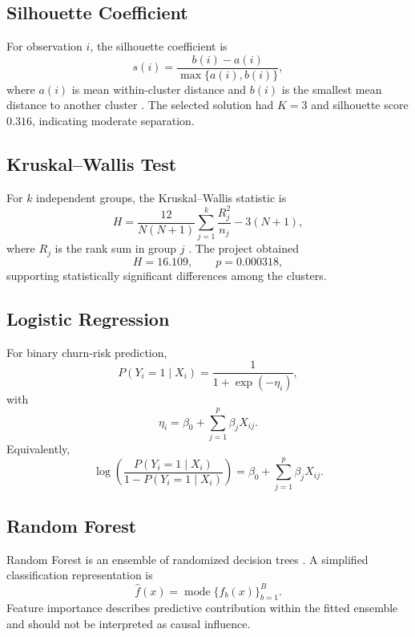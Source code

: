 \documentclass[11pt,a4paper]{article}
\begin{document}
\subsection{Silhouette Coefficient}

For observation $i$, the silhouette coefficient is
\begin{equation}
s(i)=
\frac{b(i)-a(i)}
{\max\{a(i),b(i)\}},
\end{equation}
where $a(i)$ is mean within-cluster distance and $b(i)$ is the smallest
mean distance to another cluster \cite{silhouette}. The selected
solution had $K=3$ and silhouette score $0.316$, indicating moderate
separation.

\subsection{Kruskal--Wallis Test}

For $k$ independent groups, the Kruskal--Wallis statistic is
\begin{equation}
H=
\frac{12}{N(N+1)}
\sum_{j=1}^{k}\frac{R_j^2}{n_j}
-3(N+1),
\end{equation}
where $R_j$ is the rank sum in group $j$ \cite{kruskal}. The project
obtained
\begin{equation}
H=16.109,\qquad p=0.000318,
\end{equation}
supporting statistically significant differences among the clusters.

\subsection{Logistic Regression}

For binary churn-risk prediction,
\begin{equation}
P(Y_i=1\mid X_i)=
\frac{1}{1+\exp(-\eta_i)},
\end{equation}
with
\begin{equation}
\eta_i=\beta_0+\sum_{j=1}^{p}\beta_jX_{ij}.
\end{equation}
Equivalently,
\begin{equation}
\log\left(\frac{P(Y_i=1\mid X_i)}
{1-P(Y_i=1\mid X_i)}\right)
=\beta_0+\sum_{j=1}^{p}\beta_jX_{ij}.
\end{equation}

\subsection{Random Forest}

Random Forest is an ensemble of randomized decision trees
\cite{breiman}. A simplified classification representation is
\begin{equation}
\hat f(x)=\operatorname{mode}\{\hat f_b(x)\}_{b=1}^{B}.
\end{equation}
Feature importance describes predictive contribution within the fitted
ensemble and should not be interpreted as causal influence.
\end{document}
